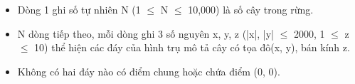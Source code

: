\begin{itemize}
	\item Dòng 1 ghi số tự nhiên N (1  $\le$  N  $\le$  10,000) là số cây trong rừng.
	\item N dòng tiếp theo, mỗi dòng ghi 3 số nguyên x, y, z (|x|, |y|  $\le$  2000, 1  $\le$  z  $\le$  10) thể hiện các đáy của hình trụ mô tả cây có tọa đô(x, y), bán kính z.
	\item Không có hai đáy nào có điểm chung hoặc chứa điểm (0, 0).
\end{itemize}